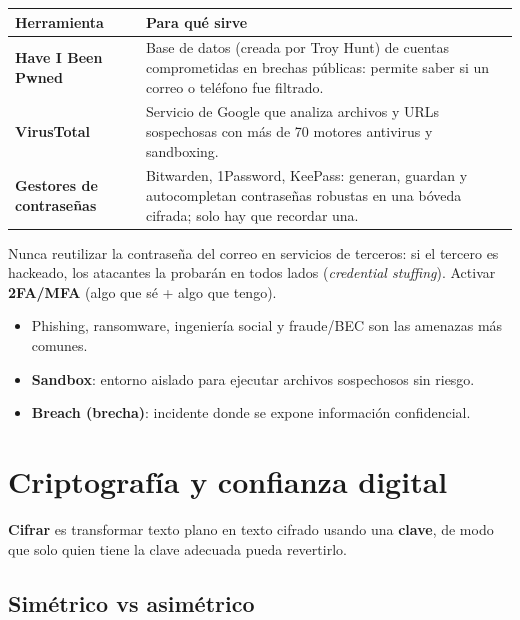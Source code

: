 \documentclass[12pt,a4paper]{article}
\begin{document}
\begin{tabularx}{\textwidth}{|>{\bfseries}p{3.4cm}|X|}
\hline
\rowcolor{grisClaro}
Herramienta & Para qu\'e sirve \\
\hline
Have I Been Pwned & Base de datos (creada por Troy Hunt) de cuentas comprometidas en brechas p\'ublicas: permite saber si un correo o tel\'efono fue filtrado. \\
\hline
VirusTotal & Servicio de Google que analiza archivos y URLs sospechosas con m\'as de 70 motores antivirus y sandboxing. \\
\hline
Gestores de contrase\~nas & Bitwarden, 1Password, KeePass: generan, guardan y autocompletan contrase\~nas robustas en una b\'oveda cifrada; solo hay que recordar una. \\
\hline
\end{tabularx}

\begin{cajaNota}[title={Regla de oro}]
Nunca reutilizar la contrase\~na del correo en servicios de terceros: si el tercero
es hackeado, los atacantes la probar\'an en todos lados (\emph{credential stuffing}).
Activar \textbf{2FA/MFA} (algo que s\'e + algo que tengo).
\end{cajaNota}

\begin{cajaResumen}
\begin{itemize}
  \item Phishing, ransomware, ingenier\'ia social y fraude/BEC son las amenazas m\'as comunes.
  \item \textbf{Sandbox}: entorno aislado para ejecutar archivos sospechosos sin riesgo.
  \item \textbf{Breach (brecha)}: incidente donde se expone informaci\'on confidencial.
\end{itemize}
\end{cajaResumen}

\section{Criptograf\'ia y confianza digital}

\begin{cajaDefinicion}
\textbf{Cifrar} es transformar texto plano en texto cifrado usando una
\textbf{clave}, de modo que solo quien tiene la clave adecuada pueda revertirlo.
\end{cajaDefinicion}

\subsection{Sim\'etrico vs asim\'etrico}
\end{document}
